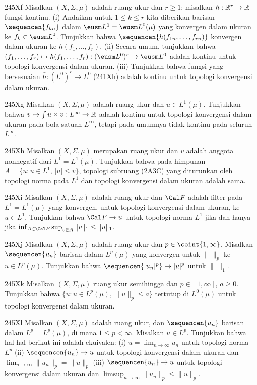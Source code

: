 {\spheader 245Xf Misalkan $(X,\Sigma,\mu)$ adalah ruang ukur dan $r\ge 1$;
misalkan $h:\Bbb R^r\to\Bbb R$ fungsi kontinu. (i) Andaikan untuk
$1\le k\le r$ kita diberikan barisan $\sequencen{f_{kn}}$ dalam $\eusm
L^0={\eusm L}^0(\mu)$ yang konvergen dalam ukuran ke $f_k\in{\eusm L}^0$.
Tunjukkan bahwa $\sequencen{h(f_{1n},\ldots,f_{rn})}$ konvergen dalam ukuran
ke $h(f_1,\ldots,f_r)$. (ii) Secara umum, tunjukkan bahwa
$(f_1,\ldots,f_r)\mapsto h(f_1,\ldots,f_r):(\eusm L^0)^r\to\eusm L^0$ adalah
kontinu untuk topologi konvergensi dalam ukuran.   (iii) Tunjukkan bahwa
fungsi yang bersesuaian $\bar h:(L^0)^r\to L^0$ (241Xh) adalah kontinu untuk
topologi konvergensi dalam ukuran.

\spheader 245Xg Misalkan $(X,\Sigma,\mu)$ adalah ruang ukur dan $u\in
L^1(\mu)$. Tunjukkan bahwa $v\mapsto\int u\times v:L^{\infty}\to\Bbb R$ adalah
kontinu untuk topologi konvergensi dalam ukuran pada bola satuan
$L^{\infty}$, tetapi pada umumnya tidak kontinu pada seluruh $L^{\infty}$.

\spheader 245Xh Misalkan $(X,\Sigma,\mu)$ merupakan ruang ukur dan $v$ adalah
anggota nonnegatif dari $L^1=L^1(\mu)$. Tunjukkan bahwa pada himpunan
$A=\{u:u\in L^1,\,|u|\le v\}$, topologi subruang (2A3C) yang diturunkan oleh
topologi norma pada $L^1$ dan topologi konvergensi dalam ukuran adalah sama.

\spheader 245Xi Misalkan $(X,\Sigma,\mu)$ adalah ruang ukur dan $\Cal F$
adalah filter pada $L^1=L^1(\mu)$ yang konvergen, untuk topologi konvergensi
dalam ukuran, ke $u\in L^1$. Tunjukkan bahwa $\Cal F\to u$ untuk topologi norma
$L^1$ jika dan hanya jika $\inf_{A\in\Cal F}\sup_{v\in
A}\|v\|_1\le\|u\|_1$.

\spheader 245Xj Misalkan $(X,\Sigma,\mu)$ adalah ruang ukur dan
$p\in\coint{1,\infty}$. Misalkan $\sequencen{u_n}$ barisan
dalam $L^p(\mu)$ yang konvergen untuk $\|\,\|_p$ ke $u\in L^p(\mu)$. Tunjukkan
bahwa $\sequencen{|u_n|^p}\to|u|^p$ untuk $\|\,\|_1$. 

\sqheader 245Xk Misalkan $(X,\Sigma,\mu)$ ruang ukur semihingga dan
$p\in[1,\infty]$, $a\ge 0$. Tunjukkan bahwa $\{u:u\in L^p(\mu),\,\|u\|_p\le
a\}$ tertutup di $L^0(\mu)$ untuk topologi konvergensi dalam ukuran.

\spheader 245Xl Misalkan $(X,\Sigma,\mu)$ adalah ruang ukur, dan
$\sequencen{u_n}$ barisan dalam $L^p=L^p(\mu)$, di mana $1\le
p<\infty$. Misalkan $u\in L^p$. Tunjukkan bahwa hal-hal berikut ini adalah
ekuivalen: (i) $u=\lim_{n\to\infty}u_n$ untuk topologi norma $L^p$ (ii)
$\sequencen{u_n}\to u$ untuk topologi konvergensi dalam ukuran dan
$\lim_{n\to\infty}\|u_n\|_p=\|u\|_p$ (iii) $\sequencen{u_n}\to u$ untuk
topologi konvergensi dalam ukuran dan
$\limsup_{n\to\infty}\|u_n\|_p\le\|u\|_p$.

}
